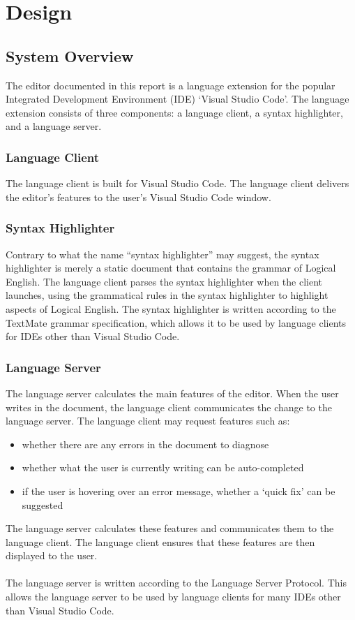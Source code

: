 \documentclass[../main.tex]{subfiles}
\begin{document}
\chapter{Design}
\section{System Overview}
The editor documented in this report is a language extension for the popular Integrated Development Environment (IDE) `Visual Studio Code'. The language extension consists of three components: a language client, a syntax highlighter, and a language server. 

\subsection{Language Client}
The language client is built for Visual Studio Code. The language client delivers the editor's features to the user's Visual Studio Code window.

\subsection{Syntax Highlighter}
Contrary to what the name ``syntax highlighter'' may suggest, the syntax highlighter is merely a static document that contains the grammar of Logical English. The language client parses the syntax highlighter when the client launches, using the grammatical rules in the syntax highlighter to highlight aspects of Logical English. The syntax highlighter is written according to the TextMate grammar specification, which allows it to be used by language clients for IDEs other than Visual Studio Code.

\subsection{Language Server}
The language server calculates the main features of the editor. When the user writes in the document, the language client communicates the change to the language server. The language client may request features such as:
\begin{itemize}
    \item whether there are any errors in the document to diagnose
    \item whether what the user is currently writing can be auto-completed
    \item if the user is hovering over an error message, whether a `quick fix' can be suggested
\end{itemize}
The language server calculates these features and communicates them to the language client. The language client ensures that these features are then displayed to the user. 
\\
\\
The language server is written according to the Language Server Protocol. This allows the language server to be used by language clients for many IDEs other than Visual Studio Code.
\end{document}
